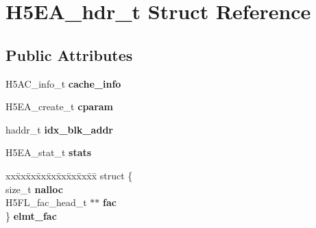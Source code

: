 \hypertarget{struct_h5_e_a__hdr__t}{}\section{H5\+E\+A\+\_\+hdr\+\_\+t Struct Reference}
\label{struct_h5_e_a__hdr__t}
\subsection*{Public Attributes}
\begin{DoxyCompactItemize}
\item 
\mbox{\label{struct_h5_e_a__hdr__t_a46676125c402ee422a2b94475e0c3b5e}} 
H5\+A\+C\+\_\+info\+\_\+t {\bfseries cache\+\_\+info}
\item 
\mbox{\label{struct_h5_e_a__hdr__t_ad06591e05f4ae37e6f71749723cd13f7}} 
H5\+E\+A\+\_\+create\+\_\+t {\bfseries cparam}
\item 
\mbox{\label{struct_h5_e_a__hdr__t_a7dda9f95610901fae7fecff4bdcbce0e}} 
haddr\+\_\+t {\bfseries idx\+\_\+blk\+\_\+addr}
\item 
\mbox{\label{struct_h5_e_a__hdr__t_a28f68e22f480e79d25cb775698e3bd3d}} 
H5\+E\+A\+\_\+stat\+\_\+t {\bfseries stats}
\item 
\mbox{\label{struct_h5_e_a__hdr__t_aeb8fc6d829cf12899e22696bc56d9174}} 
\begin{tabbing}
xx\=xx\=xx\=xx\=xx\=xx\=xx\=xx\=xx\=\kill
struct \{\\
\>size\_t {\bfseries nalloc}\\
\>H5FL\_fac\_head\_t $\ast$$\ast$ {\bfseries fac}\\
\} {\bfseries elmt\_fac}\\


\end{tabbing}
\end{DoxyCompactItemize}
